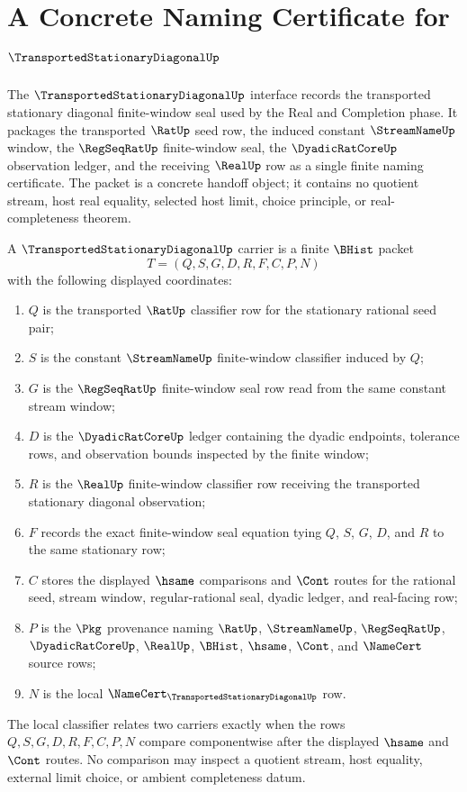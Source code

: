 \chapter{A Concrete Naming Certificate for $\TransportedStationaryDiagonalUp$}
\label{ch:concrete-instances-transportedstationarydiagonal-namecert}

The $\TransportedStationaryDiagonalUp$ interface records the transported stationary diagonal finite-window seal used by the Real and Completion phase. It packages the transported $\RatUp$ seed row, the induced constant $\StreamNameUp$ window, the $\RegSeqRatUp$ finite-window seal, the $\DyadicRatCoreUp$ observation ledger, and the receiving $\RealUp$ row as a single finite naming certificate. The packet is a concrete handoff object; it contains no quotient stream, host real equality, selected host limit, choice principle, or real-completeness theorem.

\begin{definition}
\label{def:transported-stationary-diagonal-carrier}
A $\TransportedStationaryDiagonalUp$ carrier is a finite $\BHist$ packet
$$
T=(Q,S,G,D,R,F,C,P,N)
$$
with the following displayed coordinates:
\begin{enumerate}
\item $Q$ is the transported $\RatUp$ classifier row for the stationary rational seed pair;
\item $S$ is the constant $\StreamNameUp$ finite-window classifier induced by $Q$;
\item $G$ is the $\RegSeqRatUp$ finite-window seal row read from the same constant stream window;
\item $D$ is the $\DyadicRatCoreUp$ ledger containing the dyadic endpoints, tolerance rows, and observation bounds inspected by the finite window;
\item $R$ is the $\RealUp$ finite-window classifier row receiving the transported stationary diagonal observation;
\item $F$ records the exact finite-window seal equation tying $Q$, $S$, $G$, $D$, and $R$ to the same stationary row;
\item $C$ stores the displayed $\hsame$ comparisons and $\Cont$ routes for the rational seed, stream window, regular-rational seal, dyadic ledger, and real-facing row;
\item $P$ is the $\Pkg$ provenance naming $\RatUp$, $\StreamNameUp$, $\RegSeqRatUp$, $\DyadicRatCoreUp$, $\RealUp$, $\BHist$, $\hsame$, $\Cont$, and $\NameCert$ source rows;
\item $N$ is the local $\NameCert_{\TransportedStationaryDiagonalUp}$ row.
\end{enumerate}
The local classifier relates two carriers exactly when the rows $Q,S,G,D,R,F,C,P,N$ compare componentwise after the displayed $\hsame$ and $\Cont$ routes. No comparison may inspect a quotient stream, host equality, external limit choice, or ambient completeness datum.
\end{definition}

